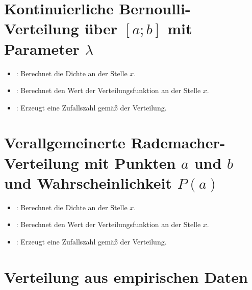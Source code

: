 \section{Kontinuierliche Bernoulli-Verteilung über \texorpdfstring{$[a;b]$}{[a;b]} mit Parameter \texorpdfstring{$\lambda$}{lambda}}

\begin{itemize}

\item
{}:
Berechnet die Dichte an der Stelle $x$.

\item
{}:
Berechnet den Wert der Verteilungsfunktion an der Stelle $x$.

\item
{}:
Erzeugt eine Zufallszahl gemäß der Verteilung.

\end{itemize}



\section{Verallgemeinerte Rademacher-Verteilung mit Punkten \texorpdfstring{$a$}{a} und \texorpdfstring{$b$}{b} und Wahrscheinlichkeit \texorpdfstring{$P(a)$}{P(a)}}

\begin{itemize}

\item
{}:
Berechnet die Dichte an der Stelle $x$.

\item
{}:
Berechnet den Wert der Verteilungsfunktion an der Stelle $x$.

\item
{}:
Erzeugt eine Zufallszahl gemäß der Verteilung.

\end{itemize}



\section{Verteilung aus empirischen Daten}

